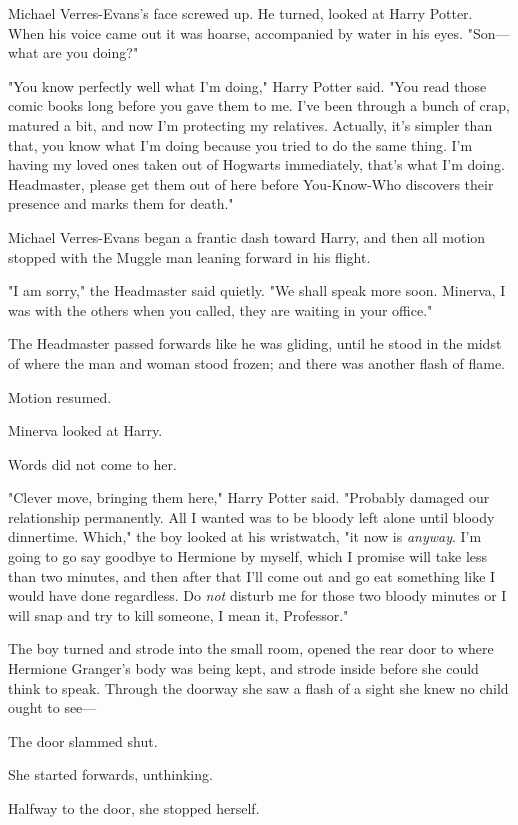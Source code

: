 Michael Verres-Evans's face screwed up. He turned, looked at Harry Potter. When 
his voice came out it was hoarse, accompanied by water in his eyes. "Son---what 
are you doing?"

"You know perfectly well what I'm doing," Harry Potter said. "You read those 
comic books long before you gave them to me. I've been through a bunch of crap, 
matured a bit, and now I'm protecting my relatives. Actually, it's simpler than 
that, you know what I'm doing because you tried to do the same thing. I'm 
having my loved ones taken out of Hogwarts immediately, that's what I'm doing. 
Headmaster, please get them out of here before You-Know-Who discovers their 
presence and marks them for death."

Michael Verres-Evans began a frantic dash toward Harry, and then all motion 
stopped with the Muggle man leaning forward in his flight.

"I am sorry," the Headmaster said quietly. "We shall speak more soon. Minerva, 
I was with the others when you called, they are waiting in your office."

The Headmaster passed forwards like he was gliding, until he stood in the midst 
of where the man and woman stood frozen; and there was another flash of flame.

Motion resumed.

Minerva looked at Harry.

Words did not come to her.

"Clever move, bringing them here," Harry Potter said. "Probably damaged our 
relationship permanently. All I wanted was to be bloody left alone until bloody 
dinnertime. Which," the boy looked at his wristwatch, "it now is \emph{anyway}. 
I'm going to go say goodbye to Hermione by myself, which I promise will take 
less than two minutes, and then after that I'll come out and go eat something 
like I would have done regardless. Do \emph{not} disturb me for those two 
bloody minutes or I will snap and try to kill someone, I mean it, Professor."

The boy turned and strode into the small room, opened the rear door to where 
Hermione Granger's body was being kept, and strode inside before she could 
think to speak. Through the doorway she saw a flash of a sight she knew no 
child ought to see---

The door slammed shut.

She started forwards, unthinking.

Halfway to the door, she stopped herself.

